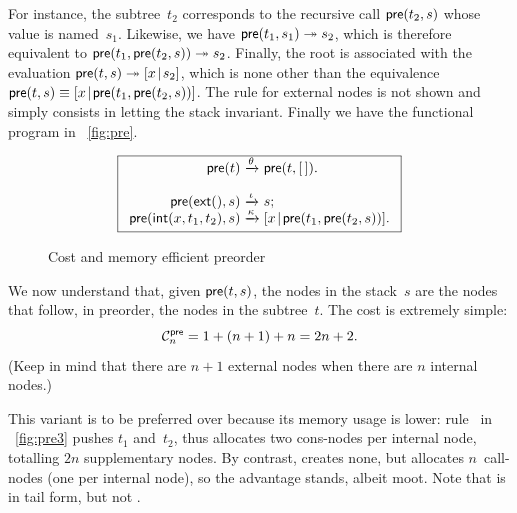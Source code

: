 For instance, the subtree~\(t_2\) corresponds to the recursive call
\(\textsf{pre}(t_2,s)\) whose value is
named~\(s_1\). Likewise, we have \(\textsf{pre}(t_1,s_1)
\twoheadrightarrow s_2\), which is therefore equivalent to
\(\textsf{pre}(t_1,\textsf{pre}(t_2,s)) \twoheadrightarrow s_2\). Finally,
the root is associated with the evaluation \(\textsf{pre}(t,s)
\twoheadrightarrow [{x}\!\mid\!{s_2}]\), which is none other than the
equivalence \(\textsf{pre}(t,s) \equiv
[{x}\!\mid\!{\textsf{pre}(t_1,\textsf{pre}(t_2,s))}]\).
The rule for external nodes is not shown and simply consists in
letting the stack invariant. Finally we have the functional program in
\fig~\vref{fig:pre}.
\begin{figure}[b]
\begin{equation*}
\boxed{
\begin{array}{r@{\;}c@{\;}l}
\fun{pre}(t) & \xrightarrow{\smash{\theta}} & \fun{pre}(t,\el).\\
\\
\fun{pre}(\fun{ext}(),s) & \xrightarrow{\smash{\iota}} & s;\\
\fun{pre}(\fun{int}(x,t_1,t_2),s)
  & \xrightarrow{\smash{\kappa}}
  & \cons{x}{\fun{pre}(t_1,\fun{pre}(t_2,s))}.
\end{array}}
\end{equation*}
\caption{Cost and memory efficient preorder}
\label{fig:pre}
\end{figure}

We now understand that, given \(\textsf{pre}(t,s)\), the nodes in the
stack~\(s\) are the nodes that follow, in preorder, the nodes in the
subtree~\(t\). The cost is extremely simple:
\begin{equation}
\C{\fun{pre}}{n} = 1 + (n+1) + n = 2n+2.\label{eq:pre}
\index{pre@$\C{\fun{pre}}{n}$}
\end{equation}
(Keep in mind that there are \(n+1\) external nodes when there are
\(n\) internal nodes.)

This variant is to be preferred over
 because its
memory usage is lower: rule~\clause{\delta} in
\fig~\vref{fig:pre3} pushes \(t_1\) and~\(t_2\), thus allocates two
cons\hyp{}nodes per internal node, totalling \(2n\)
supplementary nodes. By contrast, 
creates none, but allocates \(n\)~call\hyp{}nodes
 (one per internal node), so the
advantage stands, albeit moot. Note that
 is in tail
form, but not .

